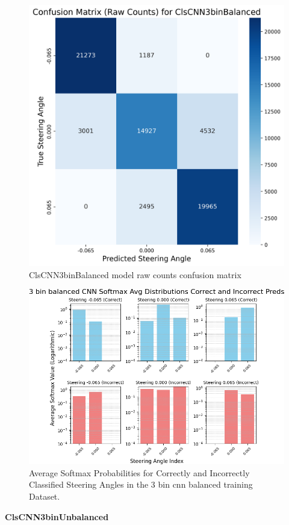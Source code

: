 \begin{figure}[H]
\centering
\includegraphics[width=0.65\linewidth]{Figures/Results/cm_raw_ClsCNN3binBalanced.png}
\caption{ClsCNN3binBalanced model raw counts confusion matrix}
\label{fig:cm_raw_ClsCNN3binBalanced}
\end{figure}

\begin{figure}[H]
    \centering
    \includegraphics[width=1\linewidth]{Figures/Results/3_bins_cnn_softmax_dist_plot_balanced.png}
    \caption{Average Softmax Probabilities for Correctly and Incorrectly Classified Steering Angles in the 3 bin cnn balanced training Dataset.}
    \label{fig:3_bins_cnn_softmax_dist_balanced}
\end{figure}


\textbf{ClsCNN3binUnbalanced}

